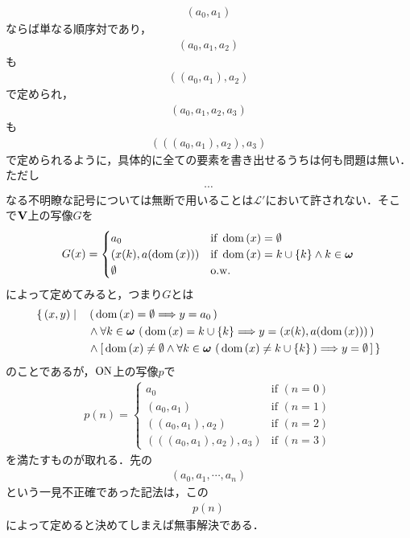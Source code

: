 		\begin{align}
			(a_0,a_1)
		\end{align}
		ならば単なる順序対であり，
		\begin{align}
			(a_0,a_1,a_2)
		\end{align}
		も
		\begin{align}
			((a_0,a_1),a_2)
		\end{align}
		で定められ，
		\begin{align}
			(a_0,a_1,a_2,a_3)
		\end{align}
		も
		\begin{align}
			(((a_0,a_1),a_2),a_3)
		\end{align}
		で定められるように，具体的に全ての要素を書き出せるうちは何も問題は無い．
		ただし
		\begin{align}
			\cdots
		\end{align}
		なる不明瞭な記号については無断で用いることは$\mathcal{L}'$において許されない．そこで$\mathbf{V}$上の写像$G$を
		\begin{align}
			G(x) = 
			\begin{cases}
				a_0 & \mbox{if } \operatorname*{dom} \left(x\right) = \emptyset \\
				(x(k),a(\operatorname*{dom} \left(x\right))) & \mbox{if } \operatorname*{dom} \left(x\right) = k \cup \{k\} \wedge k \in {\boldsymbol \omega} \\
				\emptyset & \mbox{o.w.}
			\end{cases}
		\end{align}
		によって定めてみると，つまり$G$とは
		\begin{align}
			\{\, (x,y) \mid \quad &\left(\, \operatorname*{dom} \left(x\right) = \emptyset \Longrightarrow y = a_0\, \right) \\
		&\wedge \forall k \in {\boldsymbol \omega}\, \left(\, \operatorname*{dom} \left(x\right) = k \cup \{k\} \Longrightarrow y = (x(k),a(\operatorname*{dom} \left(x\right)))\, \right) \\
		&\wedge \left[\, \operatorname*{dom} \left(x\right) \neq \emptyset \wedge \forall k \in {\boldsymbol \omega}\, \left(\, \operatorname*{dom} \left(x\right) \neq k \cup \{k\}\, \right)
		\Longrightarrow y = \emptyset\, \right]\, \}
		\end{align}
		のことであるが，$\mathrm{ON}$上の写像$p$で
		\begin{align}
			p(n) =
			\begin{cases}
				a_0 & \mbox{if } (n = 0) \\
				(a_0,a_1) & \mbox{if } (n=1) \\
				((a_0,a_1),a_2) & \mbox{if } (n=2) \\
				(((a_0,a_1),a_2),a_3) & \mbox{if } (n=3)
			\end{cases}
		\end{align}
		を満たすものが取れる．先の
		\begin{align}
			(a_0,a_1,\cdots, a_n)
		\end{align}
		という一見不正確であった記法は，この
		\begin{align}
			p(n)
		\end{align}
		によって定めると決めてしまえば無事解決である．
	